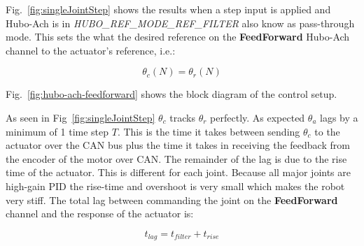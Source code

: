 Fig.~\ref{fig:singleJointStep} shows the results when a step input is applied and Hubo-Ach is in \textit{HUBO\_REF\_MODE\_REF\_FILTER} also know as pass-through mode.
This sets the what the desired reference on the \textbf{FeedForward} Hubo-Ach channel to the actuator's reference, i.e.:

\begin{equation}\label{eq:refrefmode}
 \theta_c(N) = \theta_r(N)
\end{equation}

Fig.~\ref{fig:hubo-ach-feedforward} shows the block diagram of the control setup.






As seen in Fig~\ref{fig:singleJointStep} $\theta_c$ tracks $\theta_r$ perfectly. As expected $\theta_a$ lags by a minimum of 1 time step $T$.  
This is the time it takes between sending $\theta_c$ to the actuator over the CAN bus plus the time it takes in receiving the feedback from the encoder of the motor over CAN.
The remainder of the lag is due to the rise time of the actuator.
This is different for each joint.
Because all major joints are high-gain PID the rise-time and overshoot is very small which makes the robot very stiff.
The total lag between commanding the joint on the \textbf{FeedForward} channel and the response of the actuator is:

\begin{equation}
t_{lag} = t_{filter} + t_{rise}
\end{equation}



